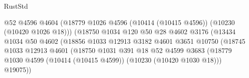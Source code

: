 \begin{lexlean}{RustStd}
\begin{coremodule}
                                                @52
                                                @4596
                                                @4604
                                                (@18779
                                                  @1026
                                                  @4596
                                                  (@10414 (@10415 @4596))
                                                  (@10230 (@10420 @1026 @18)))
                                                (@18750
                                                  @1034
                                                  @120
                                                  @50
                                                  @28
                                                  @4602
                                                  @3176
                                                  (@13434
                                                    @1034
                                                    @50
                                                    @4602
                                                    (@18856
                                                      @1033
                                                      @12913
                                                      @3182
                                                      @4601
                                                      @3651
                                                      @10750
                                                      (@18745
                                                        @1033
                                                        @12913
                                                        @4601
                                                        (@18750
                                                          @1031
                                                          @391
                                                          @18
                                                          @52
                                                          @4599
                                                          @3683
                                                          (@18779
                                                            @1030
                                                            @4599
                                                            (@10414 (@10415 @4599))
                                                            (@10230 (@10420 @1030 @18)))
                                                          @19075))

\end{coremodule}
\end{lexlean}
